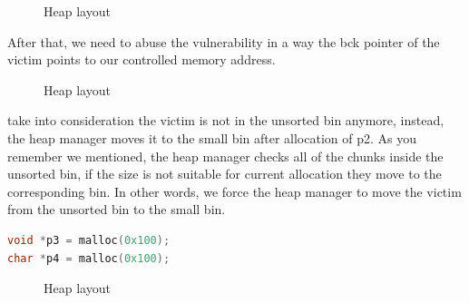 \documentclass{masterthesis}
\begin{document}
 \begin{figure}[h!]
  \caption{Heap layout}
\end{figure}
After that, we need to abuse the vulnerability in a way the bck pointer of the victim points to our controlled memory address. 
 \begin{figure}[h!]
  \caption{Heap layout}
\end{figure}
take into consideration the victim is not in the unsorted bin anymore, instead, the heap manager moves it to the small bin after allocation of p2. As you remember we mentioned, the heap manager checks all of the chunks inside the unsorted bin, if the size is not suitable for current allocation they move to the corresponding bin. In other words, we force the heap manager to move the victim from the unsorted bin to the small bin.

\begin{lstlisting}[language=c,frame=tlrb]
void *p3 = malloc(0x100);
char *p4 = malloc(0x100);
\end{lstlisting}

\begin{figure}[h!]
  \caption{Heap layout}
\end{figure}
\end{document}

